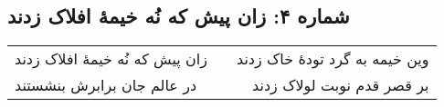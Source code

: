 \begin{center}
\section*{شماره ۴: زان پیش که نُه خیمۀ افلاک زدند}
\label{sec:004}
\begin{longtable}{l p{0.5cm} r}
زان پیش که نُه خیمهٔ افلاک زدند
&&
وین خیمه به گرد تودهٔ خاک زدند
\\
در عالم جان برابرش بنشستند
&&
بر قصر قدم نوبت لولاک زدند
\\
\end{longtable}
\end{center}
